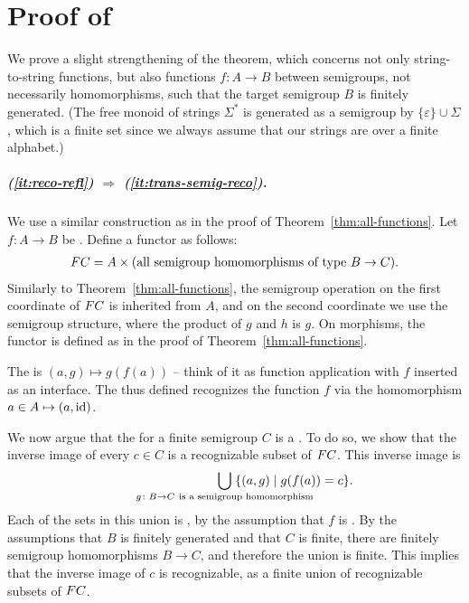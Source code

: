 \section{Proof of~}
We prove a slight strengthening of the theorem, which concerns not only
string-to-string functions, but also functions $f\colon A \to B$ between
semigroups, not necessarily homomorphisms, such that the target semigroup $B$ is
finitely generated. (The free monoid of strings $\Sigma^*$ is generated as a
semigroup by $\{\varepsilon\}\cup\Sigma$, which is a finite set since we always
assume that our strings are over a finite alphabet.)

    \subparagraph{(\ref{it:reco-refl}) $\Rightarrow$ (\ref{it:trans-semig-reco}).}  We  use a similar construction as in the proof of Theorem~\ref{thm:all-functions}. Let  $f\colon A \to B$  be .  Define  a functor as follows: 
    \begin{align*}
        \functor C = A \times \text{(all semigroup homomorphisms of type $B \to C$)}.
    \end{align*}
    Similarly to Theorem~\ref{thm:all-functions}, the semigroup operation on the first coordinate of $\functor C$ is inherited from $A$, and on the second coordinate we use the  semigroup structure,  where the product of $g$ and $h$ is $g$.     On morphisms, the functor is defined as in the proof of Theorem~\ref{thm:all-functions}. 

    The   is $(a,g) \mapsto g(f(a))$ -- think of it as function application with $f$ inserted as an interface. The  thus defined recognizes the function $f$ via the homomorphism $a \in A  \mapsto  (a,\mathrm{id})$.
    
    We now argue that the  for a finite semigroup $C$ is a .
     To do so, we show that the inverse image of every $c \in C$ is a  recognizable subset of $\functor C$. This inverse image is
    \begin{align*}
    \qquad\qquad\qquad\qquad \bigcup_{\mathclap{g\colon B \to C\ \text{is a semigroup homomorphism}}} \; \{(a,g) \mid g(f(a))=c \}.
    \end{align*}
    Each of the sets in this union is , by the assumption that $f$ is .     By the assumptions that $B$ is finitely generated and that $C$ is finite, there are finitely semigroup homomorphisms $B \to C$, and therefore the union is finite. This implies that the inverse image of $c$ is recognizable, as a finite union of recognizable subsets of  $\functor C$.
    
